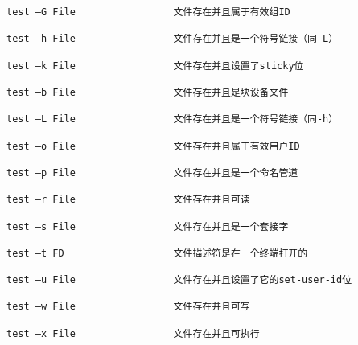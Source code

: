 \begin{verbatim}
test –G File                 文件存在并且属于有效组ID

test –h File                 文件存在并且是一个符号链接（同-L）

test –k File                 文件存在并且设置了sticky位

test –b File                 文件存在并且是块设备文件

test –L File                 文件存在并且是一个符号链接（同-h）

test –o File                 文件存在并且属于有效用户ID

test –p File                 文件存在并且是一个命名管道

test –r File                 文件存在并且可读

test –s File                 文件存在并且是一个套接字

test –t FD                   文件描述符是在一个终端打开的

test –u File                 文件存在并且设置了它的set-user-id位

test –w File                 文件存在并且可写

test –x File                 文件存在并且可执行
\end{verbatim}


